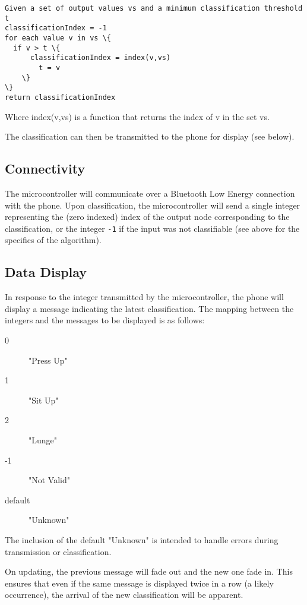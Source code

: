\documentclass[a4paper]{article}
\begin{document}
\begin{lstlisting}
Given a set of output values vs and a minimum classification threshold t
classificationIndex = -1
for each value v in vs \{
  if v > t \{
      classificationIndex = index(v,vs)
        t = v
    \}
\}
return classificationIndex
\end{lstlisting}

Where index(v,vs) is a function that returns the index of v in the set vs.


The classification can then be transmitted to the phone for display (see below).

\subsection{Connectivity}%

The microcontroller will communicate over a Bluetooth Low Energy connection with the phone. Upon classification, the microcontroller will send a single integer representing the (zero indexed) index of the output node corresponding to the classification, or the integer \lstinline{-1} if the input was not classifiable (see above for the specifics of the algorithm).

\subsection{Data Display}%

In response to the integer transmitted by the microcontroller, the phone will display a message indicating the latest classification. The mapping between the integers and the messages to be displayed is as follows:
\begin{description}
\item[0] "Press Up"
\item[1] "Sit Up"
\item[2] "Lunge"
\item[-1] "Not Valid"
\item[default] "Unknown"
\end{description}

The inclusion of the default "Unknown" is intended to handle errors during transmission or classification.

On updating, the previous message will fade out and the new one fade in. This ensures that even if the same message is displayed twice in a row (a likely occurrence), the arrival of the new classification will be apparent.
\end{document}
